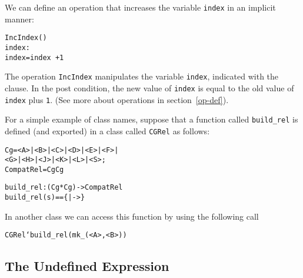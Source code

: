\documentclass[\pformat,12pt]{article}
\begin{document}
\begin{description}
  We can define an operation that increases the variable {\tt index} in
  an implicit manner:
  \begin{alltt}
    IncIndex()
     index : 
     index = index~ + 1
  \end{alltt}
  The operation {\tt IncIndex} manipulates the variable {\tt index},
  indicated with the  clause. In the post condition, the new
  value of {\tt index} is equal to the old value of {\tt index} plus
  \texttt{1}. (See more about operations in section~\ref{op-def}).

  For a simple example of 
class
  names, suppose that a function called 
  \texttt{build\_rel} is defined (and exported) in a 
class
  called 
  \texttt{CGRel} as follows:
\begin{alltt}

    Cg = <A> | <B> | <C> | <D> | <E> | <F> | 
         <G> | <H> | <J> | <K> | <L> | <S>;
    CompatRel =  Cg  Cg


    build_rel :  (Cg * Cg) -> CompatRel
    build_rel (s) == \{|->\}
\end{alltt}
In another 
class
  we can access this function by 
  using the following call 
  \begin{alltt}
  CGRel`build_rel({mk_(<A>, <B>)})
  \end{alltt}


\end{description}

\subsection{The Undefined Expression}
\end{document}
